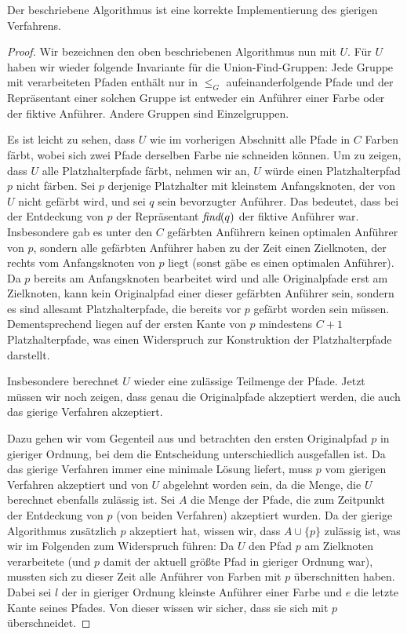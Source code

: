 \begin{lemma}
    Der beschriebene Algorithmus ist eine korrekte Implementierung des gierigen Verfahrens.
\end{lemma}
\begin{proof}
    Wir bezeichnen den oben beschriebenen Algorithmus nun mit $U$.
    Für $U$ haben wir wieder folgende Invariante für die Union-Find-Gruppen:
    Jede Gruppe mit verarbeiteten Pfaden enthält nur in $\leq_G$ aufeinanderfolgende Pfade und der Repräsentant einer
    solchen Gruppe ist entweder ein Anführer einer Farbe oder der fiktive Anführer.
    Andere Gruppen sind Einzelgruppen.

    Es ist leicht zu sehen, dass $U$ wie im vorherigen Abschnitt alle Pfade in $C$ Farben färbt, wobei sich zwei Pfade
    derselben Farbe nie schneiden können.
    Um zu zeigen, dass $U$ alle Platzhalterpfade färbt, nehmen wir an, $U$ würde einen Platzhalterpfad $p$ nicht färben.
    Sei $p$ derjenige Platzhalter mit kleinstem Anfangsknoten, der von $U$ nicht gefärbt wird, und sei $q$ sein bevorzugter Anführer.
    Das bedeutet, dass bei der Entdeckung von $p$ der Repräsentant $\text{\em find}(q)$ der fiktive Anführer war.
    Insbesondere gab es unter den $C$ gefärbten Anführern keinen optimalen Anführer von $p$, sondern alle gefärbten Anführer
    haben zu der Zeit einen Zielknoten, der rechts vom Anfangsknoten von $p$ liegt (sonst gäbe es einen optimalen Anführer).
    Da $p$ bereits am Anfangsknoten bearbeitet wird und alle Originalpfade erst am Zielknoten, kann kein Originalpfad einer
    dieser gefärbten Anführer sein, sondern es sind allesamt Platzhalterpfade, die bereits vor $p$ gefärbt worden sein müssen.
    Dementsprechend liegen auf der ersten Kante von $p$ mindestens $C+1$ Platzhalterpfade, was einen Widerspruch zur Konstruktion
    der Platzhalterpfade darstellt.

    Insbesondere berechnet $U$ wieder eine zulässige Teilmenge der Pfade.
    Jetzt müssen wir noch zeigen, dass genau die Originalpfade akzeptiert werden, die auch das gierige Verfahren
    akzeptiert.

    Dazu gehen wir vom Gegenteil aus und betrachten den ersten Originalpfad $p$ in gieriger Ordnung, bei dem die
    Entscheidung unterschiedlich ausgefallen ist.
    Da das gierige Verfahren immer eine minimale Lösung liefert, muss $p$ vom gierigen Verfahren akzeptiert und von
    $U$ abgelehnt worden sein, da die Menge, die $U$ berechnet ebenfalls zulässig ist.
    Sei $A$ die Menge der Pfade, die zum Zeitpunkt der Entdeckung von $p$ (von beiden Verfahren) akzeptiert wurden.
    Da der gierige Algorithmus zusätzlich $p$ akzeptiert hat, wissen wir, dass $A \cup \{p\}$ zulässig ist, was wir
    im Folgenden zum Widerspruch führen:
    Da $U$ den Pfad $p$ am Zielknoten verarbeitete (und $p$ damit der aktuell größte Pfad in gieriger Ordnung
    war), mussten sich zu dieser Zeit alle Anführer von Farben mit $p$ überschnitten haben.
    Dabei sei $l$ der in gieriger Ordnung kleinste Anführer einer Farbe und $e$ die letzte Kante seines Pfades.
    Von dieser wissen wir sicher, dass sie sich mit $p$ überschneidet.


\end{proof}
